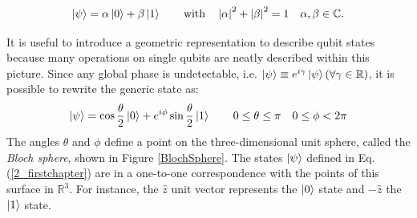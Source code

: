 \begin{equation}
 \left| \psi \right \rangle= \alpha \left| 0 \right \rangle + \beta \left| 1 \right \rangle \qquad \text{with} \quad \left| \alpha \right|^2 + \left| \beta \right|^2=1 \quad \alpha, \beta \in \mathbb{C}.
\label{2_firstchapter}
 \end{equation}

\noindent It is useful to introduce a geometric representation to describe qubit states because many operations on single qubits are neatly described within this picture. Since any global phase is undetectable, i.e. $\left| \psi \right \rangle \equiv e^{i \gamma} \left| \psi \right \rangle (\forall \gamma \in \mathbb{R})$, it is possible to rewrite the generic state as: 
\begin{equation}
 \left| \psi \right \rangle= \cos{ \frac{\theta}{2}} \left| 0 \right \rangle + e^{i \phi} \sin{ \frac{\theta}{2}} \left| 1 \right \rangle  \qquad 0\leq \theta \leq \pi \quad 0\leq \phi < 2\pi
\label{3_firstchapter}
\end{equation}
The angles $\theta$ and $\phi$ define a point on the three-dimensional unit sphere, called the \textit{Bloch sphere}, shown in Figure \ref{BlochSphere}. The states $\left| \psi \right \rangle$ defined in Eq. (\ref{2_firstchapter}) are in a one-to-one correspondence with the points of this surface in $\mathbb{R}^3$.  For instance, the $\hat{z}$ unit vector represents the $\left| 0 \right \rangle$ state and $-\hat{z}$ the $\left| 1 \right \rangle$ state.


